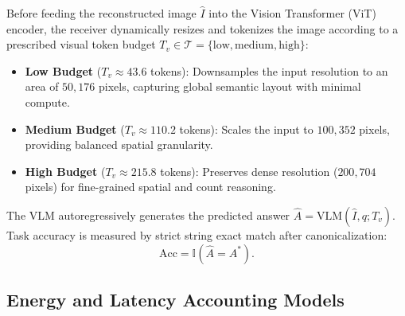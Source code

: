 Before feeding the reconstructed image $\hat{I}$ into the Vision Transformer (ViT) encoder, the receiver dynamically resizes and tokenizes the image according to a prescribed visual token budget $T_v \in \mathcal{T} = \{\mathrm{low}, \mathrm{medium}, \mathrm{high}\}$:
\begin{itemize}
    \item \textbf{Low Budget} ($T_v \approx 43.6$ tokens): Downsamples the input resolution to an area of $50{,}176$ pixels, capturing global semantic layout with minimal compute.
    \item \textbf{Medium Budget} ($T_v \approx 110.2$ tokens): Scales the input to $100{,}352$ pixels, providing balanced spatial granularity.
    \item \textbf{High Budget} ($T_v \approx 215.8$ tokens): Preserves dense resolution ($200{,}704$ pixels) for fine-grained spatial and count reasoning.
\end{itemize}
The VLM autoregressively generates the predicted answer $\hat{A} = \mathrm{VLM}(\hat{I}, q; T_v)$. Task accuracy is measured by strict string exact match after canonicalization:
\begin{equation}
\mathrm{Acc} = \mathbb{I}(\hat{A} = A^*).
\end{equation}

\subsection{Energy and Latency Accounting Models}
